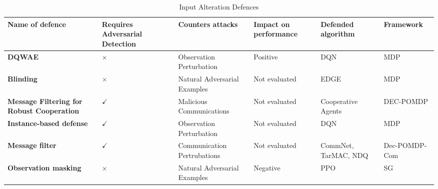 \documentclass[conference,compsoc]{IEEEtran}
\begin{document}
\begin{table}[ht]
\centering
\caption{Input Alteration Defences}
\begin{tabular}{p{3.6cm}p{1.8cm}p{2.6cm}p{1.8cm}p{2.4cm}l} 
\hline
\textbf{Name of defence}                          & \textbf{Requires Adversarial Detection} & \textbf{Counters attacks}  & \textbf{Impact on performance} & \textbf{Defended algorithm} & \textbf{Framework}  \\ 
\hline
\textbf{DQWAE \cite{ohashi_deep_2021}}                                    & $\times$                                  & Observation Perturbation    & Positive                       & DQN                        & MDP             \\ 
\textbf{Blinding \cite{guo_edge_2021}}                                     & $\times$                                  & Natural Adversarial Examples & Not evaluated                  & EDGE                       & MDP             \\ 
\textbf{Message Filtering for Robust Cooperation \cite{mitchell_gaussian_2020}} & $\checkmark$                                 & Malicious Communications    & Not evaluated                  & Cooperative Agents         & DEC-POMDP       \\ 
\textbf{Instance-based defense \cite{garcia_instance-based_2022}}                   & $\checkmark$                                 & Observation Perturbation    & Not evaluated                  & DQN                        & MDP             \\ 
\textbf{Message filter \cite{xue_mis-spoke_2022}}                           & $\checkmark$                                 & Communication Pertrubations  & Not evaluated                  & CommNet, TarMAC, NDQ       & Dec-POMDP-Com   \\
\textbf{Observation masking \cite{gleave_adversarial_2020}}                           & $\times$                                 & Natural Adversarial Examples  & Negative       & PPO      & SG   \\
\hline
\end{tabular}
\label{tab:input_alt}
\end{table}


\end{document}
